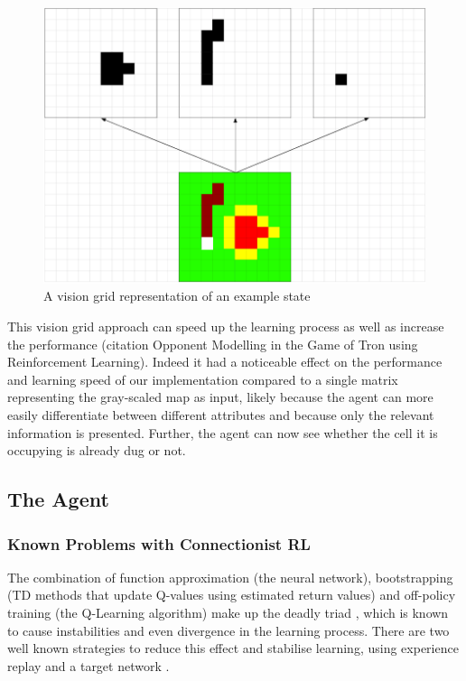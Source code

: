 \begin{figure}[h]
    \centering
    \includegraphics[width=1\linewidth]{img/Vision_Grid.png}
    \caption{A vision grid representation of an example state}
    \label{fig:visiongrid}
\end{figure}

This vision grid approach can speed up the learning process as well as increase the performance (citation Opponent Modelling in the Game of Tron using Reinforcement Learning). Indeed it had a noticeable effect on the performance and learning speed of our implementation compared to a single matrix representing the gray-scaled map as input, likely because the agent can more easily differentiate between different attributes and because only the relevant information is presented. Further, the agent can now see whether the cell it is occupying is already dug or not.


\subsection{The Agent}\label{sec:agent}


\subsubsection{Known Problems with Connectionist RL}\label{sec:problems}
The combination of function approximation (the neural network), bootstrapping (TD methods that update Q-values using estimated return values) and off-policy training (the Q-Learning algorithm) make up the deadly triad \citep{sutton_barto_2018}, which is known to cause instabilities and even divergence in the learning process. There are two well known strategies to reduce this effect and stabilise learning, using experience replay and a target network \citep{mnih2015human}.

